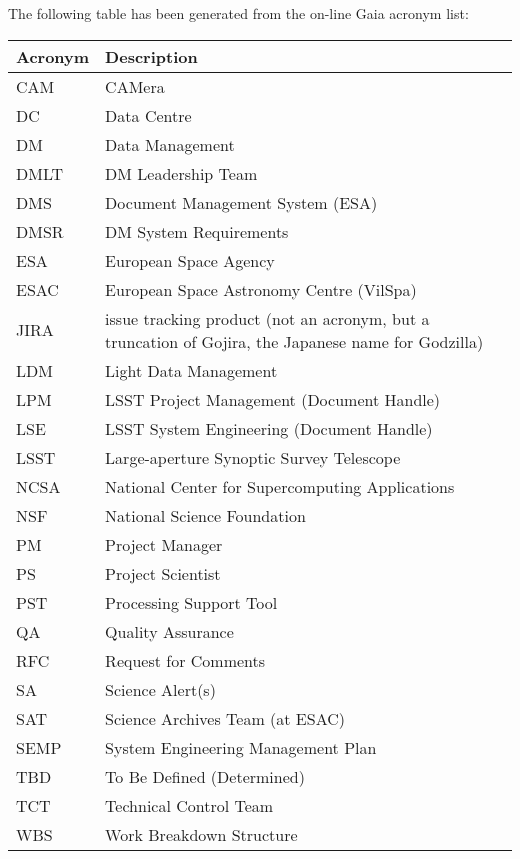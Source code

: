 The following table has been generated from the on-line Gaia acronym list:
\newline\newline%
\addtocounter{table}{-1}
\begin{longtable}{|l|p{}|}\hline 
\textbf{Acronym} & \textbf{Description}  \\\hline
CAM&CAMera \\\hline
DC&Data Centre \\\hline
DM&Data Management \\\hline
DMLT&DM Leadership Team \\\hline
DMS&Document Management System (ESA) \\\hline
DMSR&DM System Requirements \\\hline
ESA&European Space Agency \\\hline
ESAC&European Space Astronomy Centre (VilSpa) \\\hline
JIRA&issue tracking product (not an acronym, but a truncation of Gojira, the Japanese name for Godzilla) \\\hline
LDM&Light Data Management \\\hline
LPM&LSST Project Management (Document Handle) \\\hline
LSE&LSST System Engineering (Document Handle) \\\hline
LSST&Large-aperture Synoptic Survey Telescope \\\hline
NCSA&National Center for Supercomputing Applications \\\hline
NSF&National Science Foundation \\\hline
PM&Project Manager \\\hline
PS&Project Scientist \\\hline
PST&Processing Support Tool \\\hline
QA&Quality Assurance \\\hline
RFC&Request for Comments \\\hline
SA&Science Alert(s) \\\hline
SAT&Science Archives Team (at ESAC) \\\hline
SEMP&System Engineering Management Plan \\\hline
TBD&To Be Defined (Determined) \\\hline
TCT&Technical Control Team \\\hline
WBS&Work Breakdown Structure \\\hline
\end{longtable} 
